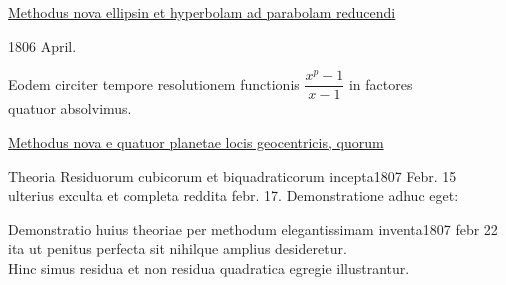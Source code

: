 \medskip
\noindent\DiaryHashEight\quad\underline{Methodus nova ellipsin et hyperbolam ad parabolam reducendi}
\par\noindent\hfill 1806 April.

\medskip
\noindent\DiaryHashEight\quad Eodem circiter tempore resolutionem functionis \(\dfrac{x^p-1}{x-1}\) in factores\\
quatuor absolvimus.

\medskip
\noindent\DiaryHashEight\quad\underline{Methodus nova e quatuor planetae locis geocentricis, quorum}\\
\underline{}

\medskip
\noindent\DiaryHashEight\quad Theoria Residuorum cubicorum et biquadraticorum incepta\hfill 1807 Febr. 15\\
ulterius exculta et completa reddita febr. 17. Demonstratione adhuc eget:

\medskip
\noindent\DiaryHashEight\quad Demonstratio huius theoriae per methodum elegantissimam inventa\hfill 1807 febr 22\\
ita ut penitus perfecta sit nihilque amplius desideretur.\\
Hinc simus residua et non residua quadratica egregie illustrantur.
\endgroup
